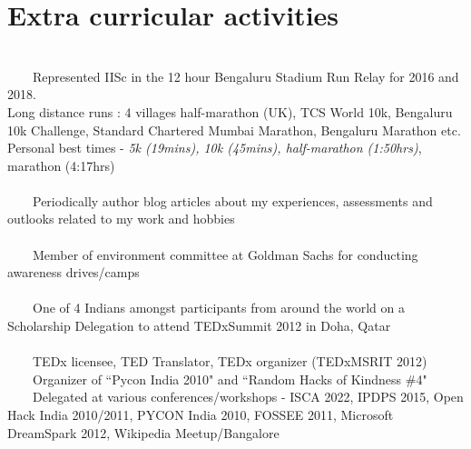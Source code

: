 \documentclass[a4paper,10pt]{article} %
\newcommand{\tabitem}{~~\llap{\textbullet}~~}
\begin{document}
\section{Extra curricular activities}
~\\
\tabitem Represented IISc in the 12 hour Bengaluru Stadium Run Relay for 2016 and 2018. \\ Long distance runs : 4 villages half-marathon (UK), TCS World 10k, Bengaluru 10k Challenge, Standard Chartered Mumbai Marathon, Bengaluru Marathon etc. \\ {\footnotesize Personal best times - \textit{5k (19mins), \space 10k (45mins), half-marathon (1:50hrs)}, marathon (4:17hrs) }\\
\\
\tabitem Periodically author blog articles about my experiences, assessments and outlooks related to my work and hobbies \\
\\
\tabitem Member of environment committee at Goldman Sachs for conducting awareness drives/camps \\
\\
\tabitem One of 4 Indians amongst participants from around the world on a Scholarship Delegation to attend TEDxSummit 2012 in Doha, Qatar \\
\\
\tabitem TEDx licensee, TED Translator, TEDx organizer (TEDxMSRIT 2012)\\
\tabitem Organizer of ``Pycon India 2010" and ``Random Hacks of Kindness \#4"\\
\tabitem Delegated at various conferences/workshops - ISCA 2022, IPDPS 2015, Open Hack India 2010/2011, PYCON India 2010, FOSSEE 2011, Microsoft DreamSpark 2012, Wikipedia Meetup/Bangalore\\

\end{document}
